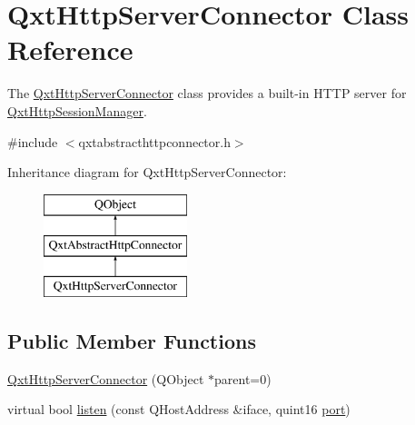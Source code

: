 \hypertarget{class_qxt_http_server_connector}{\section{Qxt\-Http\-Server\-Connector Class Reference}
\label{class_qxt_http_server_connector}
}


The \hyperlink{class_qxt_http_server_connector}{Qxt\-Http\-Server\-Connector} class provides a built-\/in H\-T\-T\-P server for \hyperlink{class_qxt_http_session_manager}{Qxt\-Http\-Session\-Manager}.  




{\ttfamily \#include $<$qxtabstracthttpconnector.\-h$>$}

Inheritance diagram for Qxt\-Http\-Server\-Connector\-:\begin{figure}[H]
\begin{center}
\leavevmode
\includegraphics[height=3.000000cm]{class_qxt_http_server_connector}
\end{center}
\end{figure}
\subsection*{Public Member Functions}
\begin{DoxyCompactItemize}
\item 
\hyperlink{class_qxt_http_server_connector_a9a34f12c08cf48cf15f999512da22192}{Qxt\-Http\-Server\-Connector} (Q\-Object $\ast$parent=0)
\item 
virtual bool \hyperlink{class_qxt_http_server_connector_a56e142b911dd68bf21fbe4e98e60237c}{listen} (const Q\-Host\-Address \&iface, quint16 \hyperlink{classport}{port})
\end{DoxyCompactItemize}
